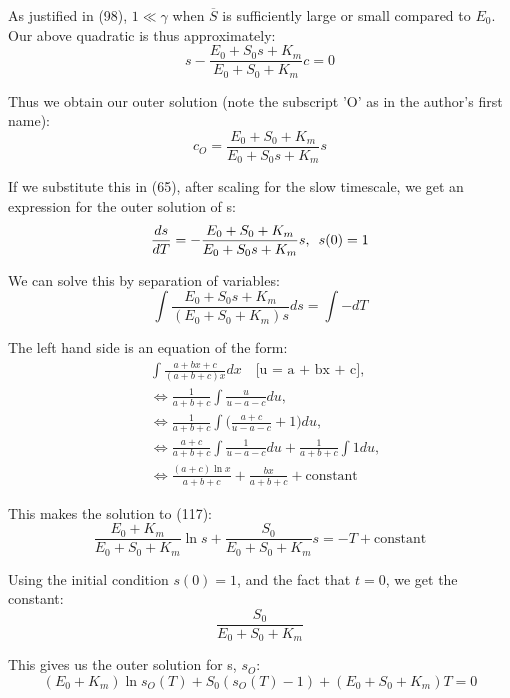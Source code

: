 \documentclass[12pt]{article}
\begin{document}
As justified in (98), $1 \ll \gamma$ when $\overline{S}$ is
sufficiently large or small compared to $E_0$. Our above quadratic is
thus approximately:
\begin{equation}
  s - \frac{E_0+S_0 s+K_m}{E_0 + S_0 + K_m} c = 0
\end{equation}

Thus we obtain our outer solution (note the subscript 'O' as in the
author's first name):
\begin{equation}
  c_O = \frac{E_0 + S_0 + K_m}{E_0+S_0 s+K_m} s
\end{equation}

If we substitute this in (65), after scaling for the slow timescale,
we get an expression for the outer solution of s:
\begin{equation}
\frac{ds}{dT} = - \frac{E_0 + S_0 + K_m}{E_0 + S_0s + K_m}s, \enskip s(0) = 1
\end{equation}

We can solve this by separation of variables:
\begin{equation}
\int \frac{E_0 + S_0 s + K_m}{(E_0 + S_0 + K_m) s} ds = \int - dT
\end{equation}

The left hand side is an equation of the form:
\begin{align}
&\int \frac{a + b x + c}{(a + b + c) x} dx
        \quad \text{[u = a + bx + c],} \\
&\iff \frac{1}{a+b+c} \int \frac{u}{u - a -c} du, \\
&\iff \frac{1}{a+b+c} \int \Big(\frac{a+c}{u - a -c} + 1\Big)
                          du, \\
&\iff \frac{a+c}{a+b+c} \int \frac{1}{u - a - c} du
                    + \frac{1}{a+b+c} \int 1 du, \\
&\iff \frac{(a+c) \ln{x}}{a+b+c} + \frac{bx}{a+b+c} + \text{constant}
\end{align}

This makes the solution to (117):
\begin{equation}
\frac{E_0+K_m}{E_0 + S_0 + K_m} \ln{s} + \frac{S_0}{E_0 + S_0 + K_m} s = - T + \text{constant}
\end{equation}

Using the initial condition $s(0)=1$, and the fact that $t=0$, we get
the constant:
\begin{equation}
  \frac{S_0}{E_0 + S_0 + K_m}
\end{equation}

This gives us the outer solution for s, $s_O$:
\begin{equation}
  (E_0+K_m) \ln{s_O(T)} + S_0 (s_O(T) - 1) + (E_0 + S_0 + K_m) T = 0
\end{equation}
\end{document}
